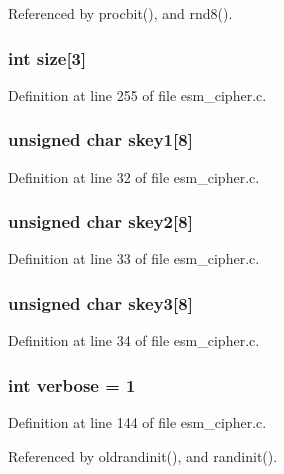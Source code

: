 Referenced by procbit(), and rnd8().
\subsubsection{\setlength{\rightskip}{0pt plus 5cm}int {\bf size}[3]}\label{esm__cipher_8c_a29}




Definition at line 255 of file esm\_\-cipher.c.
\subsubsection{\setlength{\rightskip}{0pt plus 5cm}unsigned char {\bf skey1}[8]}\label{esm__cipher_8c_a9}




Definition at line 32 of file esm\_\-cipher.c.
\subsubsection{\setlength{\rightskip}{0pt plus 5cm}unsigned char {\bf skey2}[8]}\label{esm__cipher_8c_a10}




Definition at line 33 of file esm\_\-cipher.c.
\subsubsection{\setlength{\rightskip}{0pt plus 5cm}unsigned char {\bf skey3}[8]}\label{esm__cipher_8c_a11}




Definition at line 34 of file esm\_\-cipher.c.
\subsubsection{\setlength{\rightskip}{0pt plus 5cm}int {\bf verbose} = 1}\label{esm__cipher_8c_a28}




Definition at line 144 of file esm\_\-cipher.c.

Referenced by oldrandinit(), and randinit().